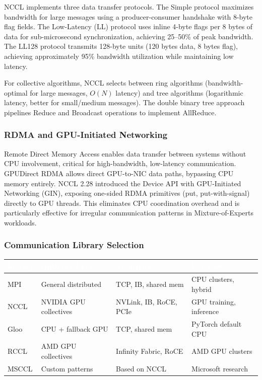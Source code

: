 \documentclass[11pt,letterpaper]{article}
\newcommand{\tableheader}[1]{\textbf{\sffamily\textcolor{white}{#1}}}
\begin{document}
NCCL implements three data transfer protocols. The Simple protocol maximizes bandwidth for large messages using a producer-consumer handshake with 8-byte flag fields. The Low-Latency (LL) protocol uses inline 4-byte flags per 8 bytes of data for sub-microsecond synchronization, achieving 25--50\% of peak bandwidth. The LL128 protocol transmits 128-byte units (120 bytes data, 8 bytes flag), achieving approximately 95\% bandwidth utilization while maintaining low latency.

For collective algorithms, NCCL selects between ring algorithms (bandwidth-optimal for large messages, $O(N)$ latency) and tree algorithms (logarithmic latency, better for small/medium messages). The double binary tree approach pipelines Reduce and Broadcast operations to implement AllReduce.

\subsubsection{RDMA and GPU-Initiated Networking}

Remote Direct Memory Access enables data transfer between systems without CPU involvement, critical for high-bandwidth, low-latency communication. GPUDirect RDMA allows direct GPU-to-NIC data paths, bypassing CPU memory entirely. NCCL 2.28 introduced the Device API with GPU-Initiated Networking (GIN), exposing one-sided RDMA primitives (put, put-with-signal) directly to GPU threads. This eliminates CPU coordination overhead and is particularly effective for irregular communication patterns in Mixture-of-Experts workloads.

\subsubsection{Communication Library Selection}

\begin{center}
\begin{tabularx}{\textwidth}{L{2cm}L{3cm}L{3cm}X}
\toprule
{}
\tableheader{Library} & \tableheader{Optimized For} & \tableheader{Transport} & \tableheader{Use Case} \\
\midrule
MPI & General distributed & TCP, IB, shared mem & CPU clusters, hybrid \\
NCCL & NVIDIA GPU collectives & NVLink, IB, RoCE, PCIe & GPU training, inference \\
Gloo & CPU + fallback GPU & TCP, shared mem & PyTorch default CPU \\
RCCL & AMD GPU collectives & Infinity Fabric, RoCE & AMD GPU clusters \\
MSCCL & Custom patterns & Based on NCCL & Microsoft research \\
\bottomrule
\end{tabularx}
\end{center}
\end{document}
